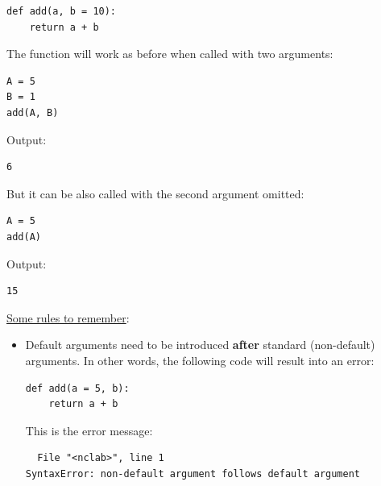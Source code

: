 \begin{verbatim}
def add(a, b = 10):
    return a + b
\end{verbatim}
The function will work as before when called with two arguments: 

\begin{verbatim}
A = 5
B = 1
add(A, B)
\end{verbatim}
Output:
\begin{verbatim}
6
\end{verbatim}
But it can be also called with the second argument omitted:
\begin{verbatim}
A = 5
add(A)
\end{verbatim}
Output:
\begin{verbatim}
15
\end{verbatim}
\underline{Some rules to remember}:
\begin{itemize}
\item Default arguments need to be introduced {\bf after} standard (non-default) arguments. In other words, the 
      following code will result into an error:
\begin{verbatim}
def add(a = 5, b):
    return a + b
\end{verbatim}
This is the error message:
\begin{verbatim}
  File "<nclab>", line 1
SyntaxError: non-default argument follows default argument


\end{verbatim}
\end{itemize}
